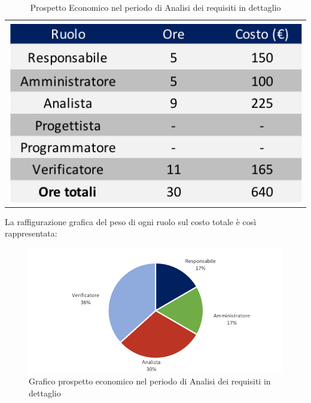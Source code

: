 \begin{table}[!ht]
	\begin{center}
	\begin{tabular}{c}
	\includegraphics{images/tabellaProspettoEconomicoDett.png}
    \end{tabular}
	\caption{Prospetto Economico nel periodo di Analisi dei requisiti in dettaglio}
	\end{center}
\end{table}

La raffigurazione grafica del peso di ogni ruolo sul costo totale è così rappresentata:
\begin{figure}[!ht]
	\begin{center}
	\includegraphics{images/grafoProspettoEconomicoDett.png}
	\caption{Grafico prospetto economico nel periodo di Analisi dei requisiti in dettaglio }
	\end{center}
\end{figure}